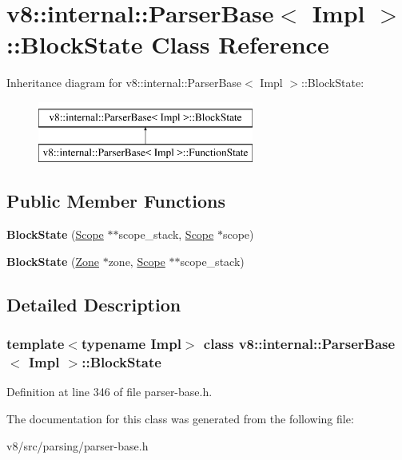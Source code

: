 \hypertarget{classv8_1_1internal_1_1ParserBase_1_1BlockState}{}\section{v8\+:\+:internal\+:\+:Parser\+Base$<$ Impl $>$\+:\+:Block\+State Class Reference}
\label{classv8_1_1internal_1_1ParserBase_1_1BlockState}
Inheritance diagram for v8\+:\+:internal\+:\+:Parser\+Base$<$ Impl $>$\+:\+:Block\+State\+:\begin{figure}[H]
\begin{center}
\leavevmode
\includegraphics[height=2.000000cm]{classv8_1_1internal_1_1ParserBase_1_1BlockState}
\end{center}
\end{figure}
\subsection*{Public Member Functions}
\begin{DoxyCompactItemize}
\item 
\mbox{\label{classv8_1_1internal_1_1ParserBase_1_1BlockState_ab96f7c10cac65c4fc0c887ea1d6ac59b}} 
{\bfseries Block\+State} (\mbox{\hyperlink{classv8_1_1internal_1_1Scope}{Scope}} $\ast$$\ast$scope\+\_\+stack, \mbox{\hyperlink{classv8_1_1internal_1_1Scope}{Scope}} $\ast$scope)
\item 
\mbox{\label{classv8_1_1internal_1_1ParserBase_1_1BlockState_a92d35578ab6855b75ed8e687ba13c769}} 
{\bfseries Block\+State} (\mbox{\hyperlink{classv8_1_1internal_1_1Zone}{Zone}} $\ast$zone, \mbox{\hyperlink{classv8_1_1internal_1_1Scope}{Scope}} $\ast$$\ast$scope\+\_\+stack)
\end{DoxyCompactItemize}


\subsection{Detailed Description}
\subsubsection*{template$<$typename Impl$>$\newline
class v8\+::internal\+::\+Parser\+Base$<$ Impl $>$\+::\+Block\+State}



Definition at line 346 of file parser-\/base.\+h.



The documentation for this class was generated from the following file\+:\begin{DoxyCompactItemize}
\item 
v8/src/parsing/parser-\/base.\+h\end{DoxyCompactItemize}
